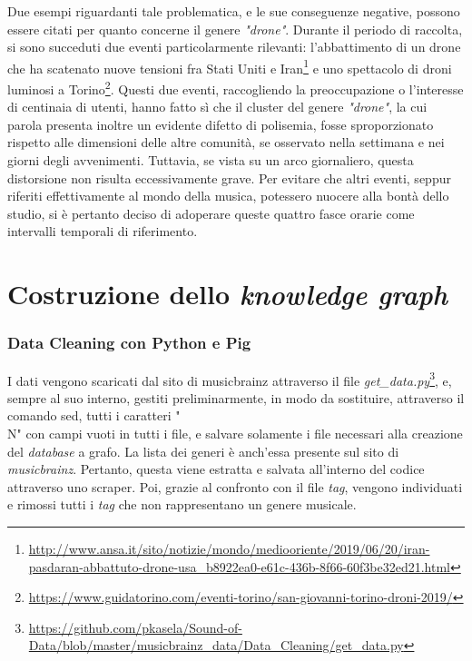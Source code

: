 \documentclass[12pt, a4paper, twocolumn]{article} %
\begin{document}
Due esempi riguardanti tale problematica, e le sue conseguenze negative, possono essere citati per quanto concerne il genere \textit{"drone"}. Durante il periodo di raccolta, si sono succeduti due eventi particolarmente rilevanti: l'abbattimento di un drone che ha scatenato nuove tensioni fra Stati Uniti e Iran\footnote{\url{http://www.ansa.it/sito/notizie/mondo/mediooriente/2019/06/20/iran-pasdaran-abbattuto-drone-usa_b8922ea0-e61c-436b-8f66-60f3be32ed21.html}} e uno spettacolo di droni luminosi a Torino\footnote{\url{https://www.guidatorino.com/eventi-torino/san-giovanni-torino-droni-2019/}}. Questi due eventi, raccogliendo la preoccupazione o l'interesse di centinaia di utenti, hanno fatto sì che il cluster del genere \textit{"drone"}, la cui parola presenta inoltre un evidente difetto di polisemia, fosse sproporzionato rispetto alle dimensioni delle altre comunità, se osservato nella settimana e nei giorni degli avvenimenti. Tuttavia, se vista su un arco giornaliero, questa distorsione non risulta eccessivamente grave. Per evitare che altri eventi, seppur riferiti effettivamente al mondo della musica, potessero nuocere alla bontà dello studio, si è pertanto deciso di adoperare queste quattro fasce orarie come intervalli temporali di riferimento.

\hfill
\newpage
\part{Costruzione dello \textit{knowledge graph}}

\section{Data Cleaning con Python e Pig}


I dati vengono scaricati dal sito di musicbrainz attraverso il file \textit{get\_data.py}\footnote{\url{https://github.com/pkasela/Sound-of-Data/blob/master/musicbrainz_data/Data_Cleaning/get_data.py}}, e, sempre al suo interno, gestiti preliminarmente, in modo da sostituire, attraverso il comando sed, tutti i caratteri "\\N" con campi vuoti in tutti i file, e salvare solamente i file necessari alla creazione del \textit{database} a grafo. 
La lista dei generi è anch'essa presente sul sito di \textit{musicbrainz}. Pertanto, questa viene estratta e salvata all'interno del codice attraverso uno scraper. Poi, grazie al confronto con il file \textit{tag}, vengono individuati e rimossi tutti i \textit{tag} che non rappresentano un genere musicale.
\end{document}
